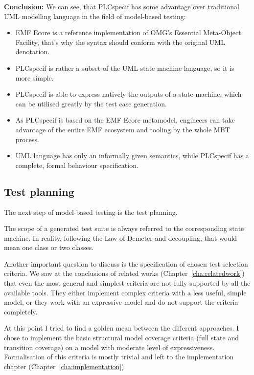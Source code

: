 \textbf{Conclusion:} We can see, that PLCspecif has some advantage over traditional UML modelling language in the field of model-based testing:

\begin{itemize}
	\item EMF Ecore is a reference implementation of OMG's Essential Meta-Object Facility, that's why the syntax should conform with the original UML denotation.
	\item PLCspecif is rather a subset of the UML state machine language, so it is more simple.
	\item PLCspecif is able to express natively the outputs of a state machine, which can be utilised greatly by the test case generation.
	\item As PLCspecif is based on the EMF Ecore metamodel, engineers can take advantage of the entire EMF ecosystem and tooling by the whole MBT process.
	\item UML language has only an informally given semantics, while PLCspecif has a complete, formal behaviour specification.
\end{itemize}



\subsection{Test planning}
\label{sub:designtestplanning}

The next step of model-based testing is the test planning.

The scope of a generated test suite is always referred to the corresponding state machine. In reality, following the Law of Demeter and decoupling, that would mean one class or two classes.

Another important question to discuss is the specification of chosen test selection criteria. We saw at the conclusions of related works (Chapter~\ref{cha:relatedwork}) that even the most general and simplest criteria are not fully supported by all the available tools. They either implement complex criteria with a less useful, simple model, or they work with an expressive model and do not support the criteria completely.

At this point I tried to find a golden mean between the different approaches. I chose to implement the basic structural model coverage criteria (full state and transition coverage) on a model with moderate level of expressiveness. Formalisation of this criteria is mostly trivial and left to the implementation chapter (Chapter~\ref{cha:implementation}).


